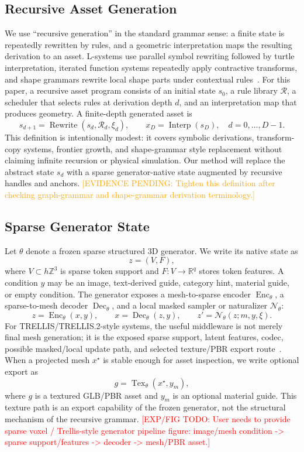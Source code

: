 \documentclass[sigconf,anonymous,review]{acmart}
\providecommand{\EvidencePending}[1]{\textcolor{orange}{[EVIDENCE PENDING: #1]}}
\providecommand{\ExpFigTODO}[1]{\textcolor{red}{[EXP/FIG TODO: #1]}}
\begin{document}
\subsection{Recursive Asset Generation}
We use ``recursive generation'' in the standard grammar sense: a finite state is repeatedly rewritten by rules, and a geometric interpretation maps the resulting derivation to an asset. L-systems use parallel symbol rewriting followed by turtle interpretation, iterated function systems repeatedly apply contractive transforms, and shape grammars rewrite local shape parts under contextual rules~\cite{lindenmayer1968lsystemsI,prusinkiewicz1990abop,barnsley1988fractalsEverywhere,stiny1972shapegrammars,mueller2006procedural}. For this paper, a recursive asset program consists of an initial state $s_0$, a rule library $\mathcal R$, a scheduler that selects rules at derivation depth $d$, and an interpretation map that produces geometry. A finite-depth generated asset is
\[
s_{d+1}=\operatorname{Rewrite}(s_d,\mathcal R_d,\xi_d),
\qquad
x_D=\operatorname{Interp}(s_D),
\quad d=0,\ldots,D-1.
\]
This definition is intentionally modest: it covers symbolic derivations, transform-copy systems, frontier growth, and shape-grammar style replacement without claiming infinite recursion or physical simulation. Our method will replace the abstract state $s_d$ with a sparse generator-native state augmented by recursive handles and anchors. \EvidencePending{Tighten this definition after checking graph-grammar and shape-grammar derivation terminology.}

\subsection{Sparse Generator State}
Let $\theta$ denote a frozen sparse structured 3D generator. We write its native state as
\[
z=(V,F),
\]
where $V\subset h\mathbb Z^3$ is sparse token support and $F:V\rightarrow\mathbb R^q$ stores token features. A condition $y$ may be an image, text-derived guide, category hint, material guide, or empty condition. The generator exposes a mesh-to-sparse encoder $\operatorname{Enc}_{\theta}$, a sparse-to-mesh decoder $\operatorname{Dec}_{\theta}$, and a local masked sampler or naturalizer $\mathcal N_{\theta}$:
\[
z=\operatorname{Enc}_{\theta}(x,y),\qquad
x=\operatorname{Dec}_{\theta}(z,y),\qquad
z'=\mathcal N_{\theta}(z;m,y,\xi).
\]
For TRELLIS/TRELLIS.2-style systems, the useful middleware is not merely final mesh generation; it is the exposed sparse support, latent features, codec, possible masked/local update path, and selected texture/PBR export route~\cite{trellis2024,trellis2project}. When a projected mesh $x^\star$ is stable enough for asset inspection, we write optional export as
\[
g=\operatorname{Tex}_{\theta}(x^\star,y_m),
\]
where $g$ is a textured GLB/PBR asset and $y_m$ is an optional material guide. This texture path is an export capability of the frozen generator, not the structural mechanism of the recursive grammar. \ExpFigTODO{User needs to provide sparse voxel / Trellis-style generator pipeline figure: image/mesh condition -> sparse support/features -> decoder -> mesh/PBR asset.}
\end{document}
